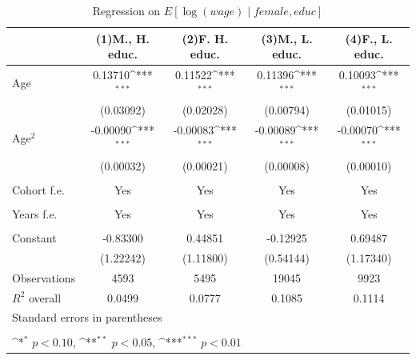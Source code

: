 \begin{table}[htbp]\centering
\def\sym#1{\ifmmode^{#1}\else\(^{#1}\)\fi}
\caption{Regression on \(E[\log(wage)\mid female,educ]\) \label{Tab:reg2}}
\begin{tabular}{l*{4}{c}}
\toprule
                    &\multicolumn{1}{c}{(1)M., H. educ.\label{Reg:2_H_M}}         &\multicolumn{1}{c}{(2)F. H. educ.\label{Reg:2_H_F} }        &\multicolumn{1}{c}{(3)M., L. educ.\label{Reg:2_L_M}}         &\multicolumn{1}{c}{(4)F., L. educ.\label{Reg:2_L_F}}         \\
\midrule
Age                 &     0.13710\sym{***}&     0.11522\sym{***}&     0.11396\sym{***}&     0.10093\sym{***}\\
                    &   (0.03092)         &   (0.02028)         &   (0.00794)         &   (0.01015)         \\
\addlinespace
Age\(^2\)           &    -0.00090\sym{***}&    -0.00083\sym{***}&    -0.00089\sym{***}&    -0.00070\sym{***}\\
                    &   (0.00032)         &   (0.00021)         &   (0.00008)         &   (0.00010)         \\

\\
Cohort f.e.          &       Yes        &      Yes &       Yes        &      Yes \\
                            \\
\addlinespace
Years f.e.            &       Yes         &       Yes   &       Yes        &      Yes       \\
                           \\
\addlinespace

Constant            &    -0.83300         &     0.44851         &    -0.12925         &     0.69487         \\
                    &   (1.22242)         &   (1.11800)         &   (0.54144)         &   (1.17340)         \\
\midrule
Observations        &        4593         &        5495         &       19045         &        9923         \\
$R^2$ overall       &   0.0499 &0.0777 &0.1085&0.1114\\
\bottomrule
\multicolumn{5}{l}{\footnotesize Standard errors in parentheses}\\
\multicolumn{5}{l}{\footnotesize }\\
\multicolumn{5}{l}{\footnotesize \sym{*} \(p<0.10\), \sym{**} \(p<0.05\), \sym{***} \(p<0.01\)}\\
\end{tabular}
\end{table}
